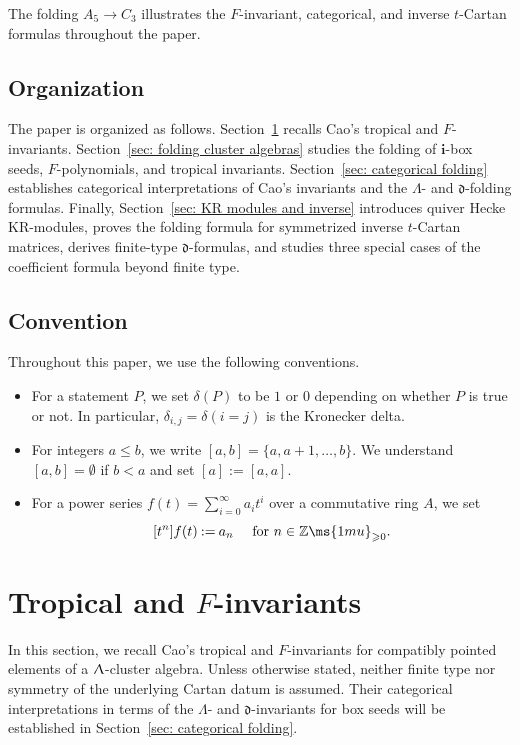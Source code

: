\documentclass[12pt, leqno]{amsart}
\numberwithin{equation}{section}
\theoremstyle{plain}
\theoremstyle{definition}
\renewcommand{\le}{\leqslant}
\renewcommand{\ge}{\geqslant}
\newcommand{\seteq}{\mathbin{:=}}
\newcommand{\Z}{\mathbb{Z}\ms{1mu}}
\newcommand{\de}{\mathfrak{d}}
\newcommand{\bfi}{\mathbf{i}}
\newcommand{\bitem}{\begin{itemize}}
\newcommand{\eitem}{\end{itemize}}
\begin{document}
\smallskip

The folding \(A_5\longrightarrow C_3\) illustrates the
\(F\)-invariant, categorical, and inverse \(t\)-Cartan formulas
throughout the paper.

\subsection*{Organization}
The paper is organized as follows.
Section~\ref{sec: F-invariant} recalls Cao's tropical and
\(F\)-invariants.
Section~\ref{sec: folding cluster algebras} studies the folding
of \(\bfi\)-box seeds, \(F\)-polynomials, and tropical invariants.
Section~\ref{sec: categorical folding} establishes categorical interpretations of Cao's invariants and the \(\Lambda\)- and \(\de\)-folding
formulas.
Finally, Section~\ref{sec: KR modules and inverse} introduces
quiver Hecke KR-modules, proves the folding formula for
symmetrized inverse \(t\)-Cartan matrices, derives finite-type
\(\de\)-formulas, and studies three special cases 
of the coefficient formula beyond finite type.

\subsection*{Convention}
Throughout this paper, we use the following conventions.
\bitem
\item For a statement $P$, we set $\delta(P)$ to be $1$ or $0$ depending on whether $P$ is true or not. In particular, $\delta_{i,j}=\delta(i=j)$
is the Kronecker delta.
\item For integers $a\le b$, we write $[a,b]=\{a,a+1,\ldots,b\}$.
We understand $[a,b] = \emptyset$ if $b<a$ and set $[a]\seteq [a,a]$.
\item For a power series $f(t) = \sum_{i=0}^\infty a_i t^i$ over a commutative ring $A$, we set 
$$
[t^n] f(t) \seteq a_n \quad \text{ for $n\in \Z_{\ge 0}$.}
$$
\eitem



 

\section{Tropical and \(F\)-invariants}
\label{sec: F-invariant}

In this section, we recall Cao's tropical and \(F\)-invariants
\cite{Cao23} for compatibly pointed elements of a
\(\Uplambda\)-cluster algebra.
Unless otherwise stated, neither finite type nor symmetry of the
underlying Cartan datum is assumed.
Their categorical interpretations in terms of the
\(\Lambda\)- and \(\de\)-invariants for box seeds will be
established in Section~\ref{sec: categorical folding}.
\end{document}
